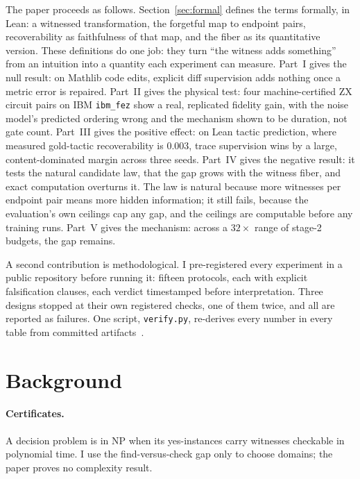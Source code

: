 The paper proceeds as follows. Section~\ref{sec:formal} defines the terms formally, in Lean: a witnessed transformation, the forgetful map to endpoint pairs, recoverability as faithfulness of that map, and the fiber as its quantitative version. These definitions do one job: they turn ``the witness adds something'' from an intuition into a quantity each experiment can measure. Part~I gives the null result: on Mathlib code edits, explicit diff supervision adds nothing once a metric error is repaired. Part~II gives the physical test: four machine-certified ZX circuit pairs on IBM \texttt{ibm\_fez} show a real, replicated fidelity gain, with the noise model's predicted ordering wrong and the mechanism shown to be duration, not gate count. Part~III gives the positive effect: on Lean tactic prediction, where measured gold-tactic recoverability is $0.003$, trace supervision wins by a large, content-dominated margin across three seeds. Part~IV gives the negative result: it tests the natural candidate law, that the gap grows with the witness fiber, and exact computation overturns it. The law is natural because more witnesses per endpoint pair means more hidden information; it still fails, because the evaluation's own ceilings cap any gap, and the ceilings are computable before any training runs. Part~V gives the mechanism: across a $32\times$ range of stage-2 budgets, the gap remains.

A second contribution is methodological. I pre-registered every experiment in a public repository before running it: fifteen protocols, each with explicit falsification clauses, each verdict timestamped before interpretation. Three designs stopped at their own registered checks, one of them twice, and all are reported as failures. One script, \texttt{verify.py}, re-derives every number in every table from committed artifacts~\cite{appliedrepo2026}.

\section{Background}\label{sec:background}

\paragraph{Certificates.} A decision problem is in $\mathrm{NP}$ when its yes-instances carry witnesses checkable in polynomial time. I use the find-versus-check gap only to choose domains; the paper proves no complexity result.

